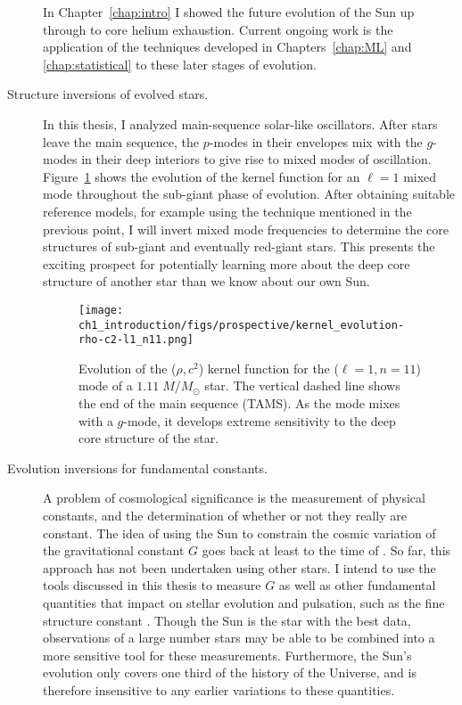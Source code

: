 \begin{description}
    In Chapter~\ref{chap:intro} I showed the future evolution of the Sun up through to core helium exhaustion. 
    Current ongoing work is the application of the techniques developed in Chapters~\ref{chap:ML} and \ref{chap:statistical} to these later stages of evolution.  
    
    
    \item[Structure inversions of evolved stars.]
    In this thesis, I analyzed main-sequence solar-like oscillators. 
    After stars leave the main sequence, the $p$-modes in their envelopes mix with the $g$-modes in their deep interiors to give rise to mixed modes of oscillation. 
    Figure~\ref{fig:kernel-evol} shows the evolution of the kernel function for an ${\ell=1}$ mixed mode throughout the sub-giant phase of evolution. 
    After obtaining suitable reference models, for example using the technique mentioned in the previous point, I will invert mixed mode frequencies to determine the core structures of sub-giant and eventually red-giant stars. 
    This presents the exciting prospect for potentially learning more about the deep core structure of another star than we know about our own Sun. 

\begin{figure}
    \centering
    \hspace*{-1.35cm}\texttt{[image: ch1\_introduction/figs/prospective/kernel\_evolution-rho-c2-l1\_n11.png]}
    \caption[Kernel function evolution]{Evolution of the (${\rho, c^2}$) kernel function for the (${\ell=1}, {n=11}$) mode of a ${1.11\; M/M_\odot}$ star. 
        The vertical dashed line shows the end of the main sequence (TAMS). 
        As the mode mixes with a $g$-mode, it develops extreme sensitivity to the deep core structure of the star. 
        \label{fig:kernel-evol}}
\end{figure}
    
    
    \item[Evolution inversions for fundamental constants.]
    A problem of cosmological significance is the measurement of physical constants, and the determination of whether or not they really are constant. 
    The idea of using the Sun to constrain the cosmic variation of the gravitational constant $G$ goes back at least to the time of \citet{Dirac199}. 
    So far, this approach has not been undertaken using other stars. 
    I intend to use the tools discussed in this thesis to measure $G$ as well as other fundamental quantities that impact on stellar evolution and pulsation, such as the fine structure constant \citep[e.g.,][]{2008JCAP...08..010A, 2010AIPC.1269...21C}. 
    Though the Sun is the star with the best data, observations of a large number stars may be able to be combined into a more sensitive tool for these measurements. 
    Furthermore, the Sun's evolution only covers one third of the history of the Universe, and is therefore insensitive to any earlier variations to these quantities. 
\end{description}

